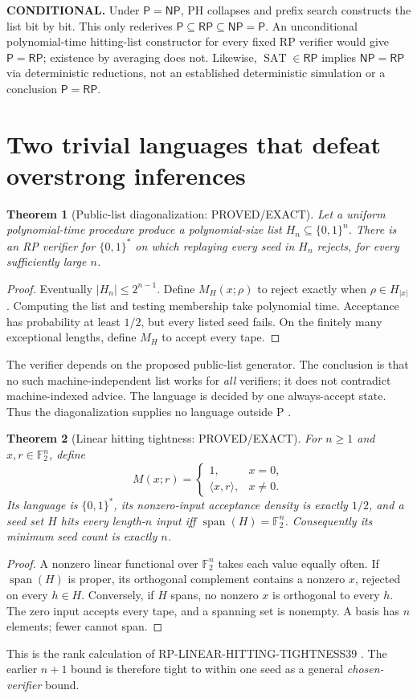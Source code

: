 \documentclass[11pt]{article}
\newtheorem{theorem}{Theorem}[section]
\newcommand{\Pclass}{\mathsf P}
\newcommand{\RP}{\mathsf{RP}}
\newcommand{\NP}{\mathsf{NP}}
\newcommand{\SAT}{\operatorname{SAT}}
\begin{document}
\textbf{CONDITIONAL.} Under $\Pclass=\NP$, PH collapses and prefix search
constructs the list bit by bit. This only rederives
$\Pclass\subseteq\RP\subseteq\NP=\Pclass$.
An unconditional polynomial-time hitting-list constructor for every fixed RP
verifier would give $\Pclass=\RP$; existence by averaging does not.
Likewise, $\SAT\in\RP$ implies $\NP=\RP$ via deterministic reductions,
not an established deterministic simulation or a conclusion $\Pclass=\RP$.

\newpage
\section{Two trivial languages that defeat overstrong inferences}
\begin{theorem}[Public-list diagonalization: PROVED/EXACT]
Let a uniform polynomial-time procedure produce a polynomial-size list
$H_n\subseteq\{0,1\}^n$. There is an RP verifier for $\{0,1\}^*$ on which
replaying every seed in $H_n$ rejects, for every sufficiently large $n$.
\end{theorem}
\begin{proof}
Eventually $|H_n|\le2^{n-1}$. Define $M_H(x;\rho)$ to reject exactly when
$\rho\in H_{|x|}$. Computing the list and testing membership take polynomial
time. Acceptance has probability at least $1/2$, but every listed seed fails.
On the finitely many exceptional lengths, define $M_H$ to accept every tape.
\end{proof}
The verifier depends on the proposed public-list generator. The conclusion
is that no such machine-independent list works for \emph{all} verifiers;
it does not contradict machine-indexed advice. The language is decided by
one always-accept state. Thus the diagonalization supplies no language outside
P \cite{seed,r36}.

\begin{theorem}[Linear hitting tightness: PROVED/EXACT]
For $n\ge1$ and $x,r\in\mathbb F_2^n$, define
\[
 M(x;r)=\begin{cases}
 1,&x=0,\\
 \langle x,r\rangle,&x\ne0.
 \end{cases}                                         \tag{3}
\]
Its language is $\{0,1\}^*$, its nonzero-input acceptance density is exactly
$1/2$, and a seed set $H$ hits every length-$n$ input iff
$\operatorname{span}(H)=\mathbb F_2^n$. Consequently its minimum seed count
is exactly $n$.
\end{theorem}
\begin{proof}
A nonzero linear functional over $\mathbb F_2^n$ takes each value equally
often. If $\operatorname{span}(H)$ is proper, its orthogonal complement
contains a nonzero $x$, rejected on every $h\in H$. Conversely, if $H$ spans,
no nonzero $x$ is orthogonal to every $h$. The zero input accepts every tape,
and a spanning set is nonempty. A basis has $n$ elements; fewer cannot span.
\end{proof}
This is the rank calculation of RP-LINEAR-HITTING-TIGHTNESS39 \cite{r39}.
The earlier $n+1$ bound is therefore tight to within one seed as a general
\emph{chosen-verifier} bound.
\end{document}
